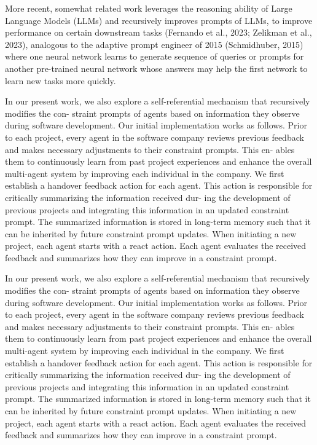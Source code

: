 \documentclass[12pt]{article}
\begin{document}
More recent, somewhat related work leverages the reasoning ability of Large Language Models
(LLMs) and recursively improves prompts of LLMs, to improve performance on certain downstream
tasks (Fernando et al., 2023; Zelikman et al., 2023), analogous to the adaptive prompt engineer of
2015 (Schmidhuber, 2015) where one neural network learns to generate sequence of queries or
prompts for another pre-trained neural network whose answers may help the first network to learn
new tasks more quickly.


In our present work, we also explore a self-referential mechanism that recursively modifies the con-
straint prompts of agents based on information they observe during software development. Our
initial implementation works as follows. Prior to each project, every agent in the software company
reviews previous feedback and makes necessary adjustments to their constraint prompts. This en-
ables them to continuously learn from past project experiences and enhance the overall multi-agent
system by improving each individual in the company. We first establish a handover feedback action
for each agent. This action is responsible for critically summarizing the information received dur-
ing the development of previous projects and integrating this information in an updated constraint
prompt. The summarized information is stored in long-term memory such that it can be inherited
by future constraint prompt updates. When initiating a new project, each agent starts with a react
action. Each agent evaluates the received feedback and summarizes how they can improve in a
constraint prompt.


In our present work, we also explore a self-referential mechanism that recursively modifies the con-
straint prompts of agents based on information they observe during software development. Our
initial implementation works as follows. Prior to each project, every agent in the software company
reviews previous feedback and makes necessary adjustments to their constraint prompts. This en-
ables them to continuously learn from past project experiences and enhance the overall multi-agent
system by improving each individual in the company. We first establish a handover feedback action
for each agent. This action is responsible for critically summarizing the information received dur-
ing the development of previous projects and integrating this information in an updated constraint
prompt. The summarized information is stored in long-term memory such that it can be inherited
by future constraint prompt updates. When initiating a new project, each agent starts with a react
action. Each agent evaluates the received feedback and summarizes how they can improve in a
constraint prompt.
\end{document}

